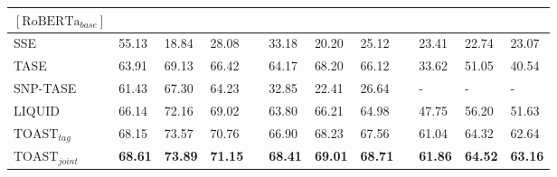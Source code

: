 \documentclass[a4paper]{cas-sc}
\newcommand{\1}[1]{\mathds{1}\left[#1\right]}
\begin{document}
\begin{table}[width=\textwidth,cols=4,pos=h]
\begin{tabular*}{\tblwidth}{@{}p{2.2cm}p{1.0cm}p{1.0cm}p{1.0cm}cp{1.0cm}p{1.0cm}p{1.0cm}cp{1.0cm}p{1.0cm}p{1.0cm}@{}}
		\toprule[0.3mm]
		$\left[\text{RoBERTa}_{base}\right]$  & & & &  & & & & & & & \\ \midrule
		SSE                & 55.13  & 18.84  & 
		28.08  & & 33.18    & 20.20   & 25.12  &  & 23.41   & 22.74  & 23.07  \\
		TASE                  & 63.91  & 69.13  & 66.42  & & 64.17    &  68.20   & 66.12  &  & 33.62   & 51.05  & 40.54  \\
		SNP-TASE             & 61.43  & 67.30  & 64.23  & & 32.85    & 22.41   & 26.64  &  & -   & -  & -  \\
		LIQUID  & 66.14  & 72.16  & 69.02 & & 63.80    & 66.21   & 64.98  &  & 47.75   & 56.20  & 51.63  \\
		$\text{TOAST}_{tag}$    & 68.15   & 73.57  &  70.76  & & 66.90   & 68.23   & 67.56  &  & 61.04   & 64.32  & 62.64  \\
		$\text{TOAST}_{joint}$         &\textbf{68.61}  & \textbf{73.89}  & \textbf{71.15} &  & \textbf{68.41 } & \textbf{69.01}   & \textbf{68.71}  & & \textbf{61.86}  & \textbf{64.52}  & \textbf{63.16}  \\ \bottomrule
	\end{tabular*}
\end{table}
\end{document}
